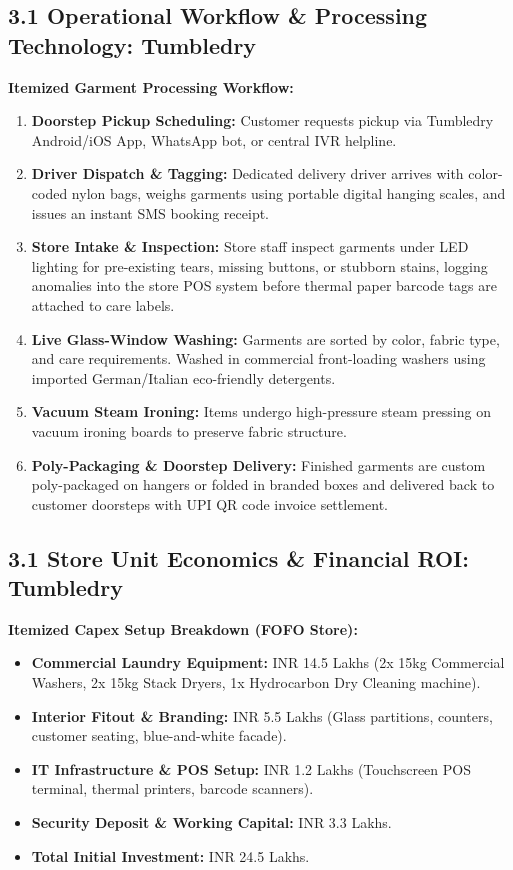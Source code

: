 \documentclass[11pt,a4paper]{article}
\begin{document}
\clearpage

\subsection{3.1 Operational Workflow \& Processing Technology: Tumbledry}
\textbf{Itemized Garment Processing Workflow:}
\begin{enumerate}
    \item \textbf{Doorstep Pickup Scheduling:} Customer requests pickup via Tumbledry Android/iOS App, WhatsApp bot, or central IVR helpline.
    \item \textbf{Driver Dispatch \& Tagging:} Dedicated delivery driver arrives with color-coded nylon bags, weighs garments using portable digital hanging scales, and issues an instant SMS booking receipt.
    \item \textbf{Store Intake \& Inspection:} Store staff inspect garments under LED lighting for pre-existing tears, missing buttons, or stubborn stains, logging anomalies into the store POS system before thermal paper barcode tags are attached to care labels.
    \item \textbf{Live Glass-Window Washing:} Garments are sorted by color, fabric type, and care requirements. Washed in commercial front-loading washers using imported German/Italian eco-friendly detergents.
    \item \textbf{Vacuum Steam Ironing:} Items undergo high-pressure steam pressing on vacuum ironing boards to preserve fabric structure.
    \item \textbf{Poly-Packaging \& Doorstep Delivery:} Finished garments are custom poly-packaged on hangers or folded in branded boxes and delivered back to customer doorsteps with UPI QR code invoice settlement.
\end{enumerate}

\clearpage

\subsection{3.1 Store Unit Economics \& Financial ROI: Tumbledry}
\textbf{Itemized Capex Setup Breakdown (FOFO Store):}
\begin{itemize}
    \item \textbf{Commercial Laundry Equipment:} INR 14.5 Lakhs (2x 15kg Commercial Washers, 2x 15kg Stack Dryers, 1x Hydrocarbon Dry Cleaning machine).
    \item \textbf{Interior Fitout \& Branding:} INR 5.5 Lakhs (Glass partitions, counters, customer seating, blue-and-white facade).
    \item \textbf{IT Infrastructure \& POS Setup:} INR 1.2 Lakhs (Touchscreen POS terminal, thermal printers, barcode scanners).
    \item \textbf{Security Deposit \& Working Capital:} INR 3.3 Lakhs.
    \item \textbf{Total Initial Investment:} INR 24.5 Lakhs.
\end{itemize}
\end{document}
